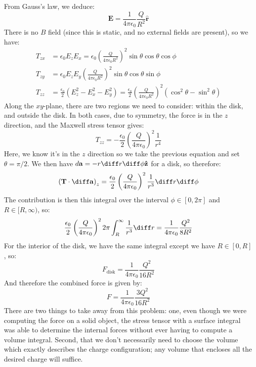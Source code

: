 \documentclass[10pt]{article}
\begin{document}
\begin{example}
\begin{solution}
			From Gauss's law, we deduce:
			\[
				\mathbf{E} = \frac{1}{4 \pi \epsilon_0}\frac{Q}{R^2} \hat{\mathbf{r}}
			\]
			There is no \( B \) field (since this is static, and no external fields are present), so we have:
			\begin{align*}
				T_{zx} &= \epsilon_0 E_z E_x = \epsilon_0\left( \frac{Q}{4 \pi \epsilon_0 R^2} \right)^2 \sin
				\theta \cos \theta \cos \phi \\ 
				T_{zy} &= \epsilon_0 E_z E_y \left( \frac{Q}{4 \pi \epsilon_0 R^2} \right)^2 \sin \theta \cos
				\theta \sin \phi\\ 
				T_{zz} &=  \frac{\epsilon_0}{2}\left( E_z^2 - E_x^2 - E_y^2 \right) =
				\frac{\epsilon_0}{2}\left( \frac{Q}{4 \pi \epsilon_0 R^2} \right)^2(\cos^2 \theta - \sin^2
				\theta) 
			\end{align*}
			Along the \( xy \)-plane, there are two regions we need to consider: within the disk, and outside
			the disk. In both cases, due to symmetry, the force is in the \( z \) direction, and the Maxwell
			stress tensor gives:
			\[
				T_{zz} = -\frac{\epsilon_0}{2}\left( \frac{Q}{4\pi \epsilon_0} \right)^2 \frac{1}{r^{4}}
			\]
			Here, we know it's in the \( z \) direction so we take the previous equation and set \( \theta =
			\pi / 2\). We then have \( d \mathbf{a} = -r \diff r \diff \phi \mathbf{\hat{z}}\) for a disk, so
			therefore:
			\[
				\left( \mathbf{T} \cdot \diff \mathbf{a} \right)_z = \frac{\epsilon_0}{2}\left( \frac{Q}{4
				\pi \epsilon_0} \right)^2 \frac{1}{r^3} \diff r \diff \phi
			\]
			The contribution is then this integral over the interval \( \phi \in [0, 2\pi] \) and \( R \in
			[R, \infty) \), so:
			\[
				\frac{\epsilon_0}{2}\left( \frac{Q}{4\pi \epsilon_0} \right)^2 2\pi
				\int_R^{\infty}\frac{1}{r^3} \diff r = \frac{1}{4 \pi \epsilon_0}\frac{Q^2}{8R^2}
			\]
			For the interior of the disk, we have the same integral except we have \( R\in [0, R] \), so:
			\[
				F_\text{disk} = \frac{1}{4\pi \epsilon_0}\frac{Q^2}{16R^2}
			\]
			And therefore the combined force is given by:
			\[
				F = \frac{1}{4\pi \epsilon_0}\frac{3Q^2}{16R^2}
			\]
			There are two things to take away from this problem: one, even though we were computing the force
			on a solid object, the stress tensor with a surface integral was able to determine the internal
			forces without ever having to compute a volume integral. Second, that we don't necessarily need
			to choose the volume which exactly describes the charge configuration; any volume that encloses
			all the desired charge will suffice. 
		\end{solution}
	\end{example}
\end{document}
